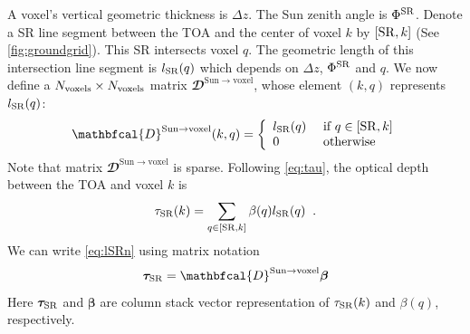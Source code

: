 \documentclass[10pt,letterpaper]{article}
\newcommand{\OpDistance}{\mathbfcal{D}}
\newcommand{\vect}[1]{\bm{#1}}
\begin{document}
A voxel's vertical geometric thickness is $\Delta z$.  The Sun zenith
angle is $\Phi^{\rm SR}$. Denote a SR line segment between the TOA and
the center of voxel $k$ by $[{\rm SR},k]$ (See
\cref{fig:groundgrid}). This SR intersects voxel $q$. The geometric
length of this intersection line segment is $l_{\rm SR}(q)$ which
depends on $\Delta z$, $\Phi^{\rm SR}$ and $q$.  We now define a
$N_{\rm voxels}\times N_{\rm voxels}$ matrix $\OpDistance^{\mathrm{Sun
    \rightarrow voxel}}$, whose element $(k,q)$ represents $l_{\rm
  SR}(q)$:
\begin{equation}
  \OpDistance^{\mathrm{Sun \rightarrow voxel}}(k,q) =
  \left\{
    \begin{array}{ll}
      l_{\rm SR}(q) & \mbox{ if $q \in[{\rm SR},k]$} \\
      0  & \mbox{ otherwise}
      \label{eq:Dsv}
    \end{array}
  \right.
  \hspace{-0.05cm}
\end{equation}
Note that matrix $\OpDistance^{\mathrm{Sun \rightarrow voxel}}$ is
sparse.  Following \cref{eq:tau}, the optical depth between the TOA
and voxel $k$ is
\begin{equation}
  \tau_{\rm SR}(k)= \sum_{q \in[{\rm SR},k]} \beta(q) l_{\rm SR}(q) \;\;.
  \label{eq:lSRn}
\end{equation}
We can write \cref{eq:lSRn} using matrix notation
\begin{equation}
  \vect{\tau}_{\rm SR}=\OpDistance^{\mathrm{Sun \rightarrow voxel}} \vect{\beta}
  \label{eq:tau_matrix}
\end{equation}
Here $\vect{\tau}_{\rm SR}$ and $\vect{\beta}$ are column stack vector
representation of $\tau_{\rm SR}(k)$ and $\beta(q)$, respectively.
\end{document}
